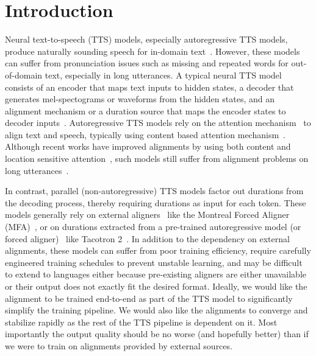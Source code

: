 \section{Introduction}

Neural text-to-speech (TTS) models, especially autoregressive TTS models, produce naturally sounding speech for in-domain text~\cite{Tacotron, Tacotron2, Flowtron}.
However, these models can suffer from pronunciation issues such as missing and repeated words for out-of-domain text, especially in long utterances. A typical neural TTS model consists of an encoder that maps text inputs to hidden states, a decoder that generates mel-spectograms or waveforms from the hidden states, and an alignment mechanism or a duration source that maps the encoder states to decoder inputs~\cite{Tacotron, Tacotron2, Flowtron, fastspeech2, yiFastSpeech, kim2020glowtts, lancucki2020fastpitch}. Autoregressive TTS models rely on the attention mechanism~\cite{Graves13, bahdanau2014neural} to align text and speech, typically using content based attention mechanism~\cite{Tacotron, Flowtron}. Although recent works have improved alignments by using both content and location sensitive attention~\cite{Tacotron2}, such models still suffer from alignment problems on long utterances~\cite{kim2020glowtts}. 

In contrast, parallel (non-autoregressive) TTS models factor out durations from the decoding process, thereby requiring durations as input for each token. These models generally rely on external aligners~\cite{fastspeech2}  like the Montreal Forced Aligner (MFA)~\cite{MFA}, or on durations extracted from a pre-trained autoregressive model (or forced aligner)~\cite{lancucki2020fastpitch, peng2020non, yiFastSpeech} like Tacotron 2~\cite{Tacotron2}. In addition to the dependency on external alignments, these models 
can suffer from poor training efficiency, %
require carefully engineered training schedules to prevent unstable learning, and may be difficult to extend to languages either because pre-existing aligners are either unavailable or their output does not exactly fit the desired format. Ideally, we would like the alignment to be trained end-to-end as part of the TTS model to significantly simplify the training pipeline. We would also like the alignments to converge and stabilize rapidly as the rest of the TTS pipeline is dependent on it. Most importantly the output quality should be no worse (and hopefully better) than if we were to train on alignments provided by external sources.


